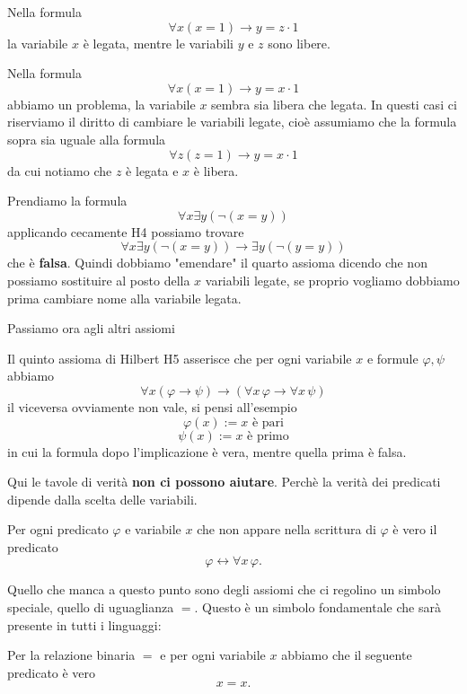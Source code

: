 \documentclass[11pt]{scrartcl}
\begin{document}
	\begin{example}
		Nella formula 
		$$\forall x (x=1) \to y=z\cdot 1$$
		la variabile $x$ è legata, mentre le variabili $y$ e $z$ sono libere.
	\end{example}
	\begin{example}
		Nella formula
		$$\forall x (x=1) \to y=x\cdot 1$$
		abbiamo un problema, la variabile $x$ sembra sia libera che legata. In questi casi ci riserviamo il diritto di cambiare le variabili legate, cioè assumiamo che la formula sopra sia uguale alla formula
		$$\forall z (z=1) \to y=x\cdot 1$$
		da cui notiamo che $z$ è legata e $x$ è libera.
	\end{example}
	\begin{example}
		Prendiamo la formula
		$$\forall x \exists y (\lnot(x=y))$$
		applicando cecamente H4 possiamo trovare
		$$\forall x \exists y (\lnot(x=y))\to \exists y (\lnot(y=y))$$
		che è \textbf{falsa}. Quindi dobbiamo "emendare" il quarto assioma dicendo che non possiamo sostituire al posto della $x$ variabili legate, se proprio vogliamo dobbiamo prima cambiare nome alla variabile legata.
	\end{example}
	Passiamo ora agli altri assiomi
	\begin{definition}
		Il quinto assioma di Hilbert H5 asserisce che per ogni variabile $x$ e formule $\varphi,\psi$ abbiamo
		$$\forall x (\varphi\to \psi)\to (\forall x \, \varphi \to \forall x \, \psi)$$
		il viceversa ovviamente non vale, si pensi all'esempio 
		$$\varphi(x):=\text{$x$ è pari}$$
		$$\psi(x):=\text{$x$ è primo}$$
		in cui la formula dopo l'implicazione è vera, mentre quella prima è falsa.
	\end{definition}
	Qui le tavole di verità \textbf{non ci possono aiutare}. Perchè la verità dei predicati dipende dalla scelta delle variabili.
	\begin{definition}
		Per ogni predicato $\varphi$ e variabile $x$ che non appare nella scrittura di $\varphi$ è vero il predicato
		$$\varphi \leftrightarrow \forall x \, \varphi.$$
	\end{definition} 
	Quello che manca a questo punto sono degli assiomi che ci regolino un simbolo speciale, quello di uguaglianza $=$. Questo è un simbolo fondamentale che sarà presente in tutti i linguaggi:
	\begin{definition}
		Per la relazione binaria $=$ e per ogni variabile $x$ abbiamo che il seguente predicato è vero
		$$x=x.$$
	\end{definition}
\end{document}
